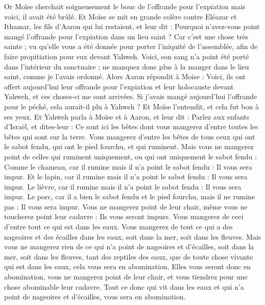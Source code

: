 \begin{multicols}{2}
Or Moïse cherchait soigneusement le bouc de l'offrande pour l'expiation mais voici, il avait été brûlé. Et Moïse se mit en grande colère contre Eléazar et Ithamar, les fils d'Aaron qui lui restaient, et leur dit :
Pourquoi n'avez-vous point mangé l'offrande pour l'expiation dans un lieu saint ? Car c'est une chose très sainte ; vu qu'elle vous a été donnée pour porter l'iniquité de l'assemblée, afin de faire propitiation pour eux devant Yahweh.
Voici, son sang n'a point été porté dans l'intérieur du sanctuaire ; ne manquez donc plus à la manger dans le lieu saint, comme je l'avais ordonné.
Alors Aaron répondit à Moise : Voici, ils ont offert aujourd'hui leur offrande pour l'expiation et leur holocauste devant Yahweh, et ces choses-ci me sont arrivées. Si j'avais mangé aujourd'hui l'offrande pour le péché, cela aurait-il plu à Yahweh ?
Et Moïse l'entendit, et cela fut bon à ses yeux.
\VerseOne{}Et Yahweh parla à Moïse et à Aaron, et leur dit :
Parlez aux enfants d'Israël, et dites-leur : Ce sont ici les bêtes dont vous mangerez d'entre toutes les bêtes qui sont sur la terre.
Vous mangerez d'entre les bêtes de tous ceux qui ont le sabot fendu, qui ont le pied fourchu, et qui ruminent.
Mais vous ne mangerez point de celles qui ruminent uniquement, ou qui ont uniquement le sabot fendu : Comme le chameau, car il rumine mais il n'a point le sabot fendu : Il vous sera impur.
Et le lapin, car il rumine mais il n'a point le sabot fendu : Il vous sera impur.
Le lièvre, car il rumine mais il n'a point le sabot fendu : Il vous sera impur.
Le porc, car il a bien le sabot fendu et le pied fourchu, mais il ne rumine pas : Il vous sera impur.
Vous ne mangerez point de leur chair, même vous ne toucherez point leur cadavre : Ils vous seront impurs.
Vous mangerez de ceci d'entre tout ce qui est dans les eaux. Vous mangerez de tout ce qui a des nageoires et des écailles dans les eaux, soit dans la mer, soit dans les fleuves.
Mais vous ne mangerez rien de ce qui n'a point de nageoires et d'écailles, soit dans la mer, soit dans les fleuves, tant des reptiles des eaux, que de toute chose vivante qui est dans les eaux, cela vous sera en abomination.
Elles vous seront donc en abomination, vous ne mangerez point de leur chair, et vous tiendrez pour une chose abominable leur cadavre.
Tout ce donc qui vit dans les eaux et qui n'a point de nageoires et d'écailles, vous sera en abomination.

\end{multicols}
